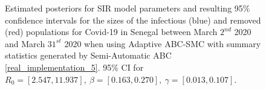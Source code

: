 \documentclass[11pt,a4paper]{article}
\theoremstyle{break}
\begin{document}
  \begin{figure}[H]
    \centering
    \caption{Estimated posteriors for SIR model parameters and resulting 95\% confidence intervals for the sizes of the infectious (blue) and removed (red) populations for Covid-19 in Senegal between March $2^{nd}$ 2020 and March $31^{st}$ 2020 when using Adaptive ABC-SMC with summary statistics generated by Semi-Automatic ABC \ref{real_implementation_5}. 95\% CI for $R_0=[2.547,11.937],\ \beta=[0.163,0.270],\ \gamma=[0.013,0.107]$.}
    \label{fig_senegal_semi_auto}
  \end{figure}
\end{document}
